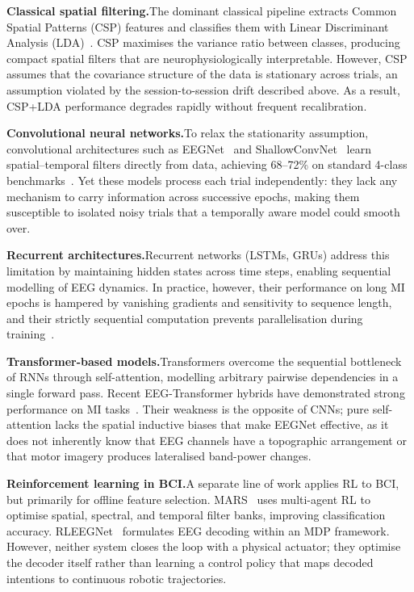 \documentclass[12pt, a4paper]{article}
\begin{document}
\textbf{Classical spatial filtering.}\quad The dominant classical pipeline extracts Common Spatial Patterns (CSP) features and classifies them with Linear Discriminant Analysis (LDA)~\cite{hameed2025enhancing}. CSP maximises the variance ratio between classes, producing compact spatial filters that are neurophysiologically interpretable. However, CSP assumes that the covariance structure of the data is stationary across trials, an assumption violated by the session-to-session drift described above. As a result, CSP+LDA performance degrades rapidly without frequent recalibration.

\textbf{Convolutional neural networks.}\quad To relax the stationarity assumption, convolutional architectures such as EEGNet~\cite{lawhern2018eegnet} and ShallowConvNet~\cite{schirrmeister2017deep} learn spatial--temporal filters directly from data, achieving 68--72\% on standard 4-class benchmarks~\cite{hameed2025enhancing}. Yet these models process each trial independently: they lack any mechanism to carry information across successive epochs, making them susceptible to isolated noisy trials that a temporally aware model could smooth over.

\textbf{Recurrent architectures.}\quad Recurrent networks (LSTMs, GRUs) address this limitation by maintaining hidden states across time steps, enabling sequential modelling of EEG dynamics. In practice, however, their performance on long MI epochs is hampered by vanishing gradients and sensitivity to sequence length, and their strictly sequential computation prevents parallelisation during training~\cite{vaswani2017attention}.

\textbf{Transformer-based models.}\quad Transformers overcome the sequential bottleneck of RNNs through self-attention, modelling arbitrary pairwise dependencies in a single forward pass. Recent EEG-Transformer hybrids have demonstrated strong performance on MI tasks~\cite{song2022eeg}. Their weakness is the opposite of CNNs; pure self-attention lacks the spatial inductive biases that make EEGNet effective, as it does not inherently know that EEG channels have a topographic arrangement or that motor imagery produces lateralised band-power changes.

\textbf{Reinforcement learning in BCI.}\quad A separate line of work applies RL to BCI, but primarily for offline feature selection. MARS~\cite{shin2024mars} uses multi-agent RL to optimise spatial, spectral, and temporal filter banks, improving classification accuracy. RLEEGNet~\cite{nallani2024rleegnet} formulates EEG decoding within an MDP framework. However, neither system closes the loop with a physical actuator; they optimise the decoder itself rather than learning a control policy that maps decoded intentions to continuous robotic trajectories.
\end{document}
